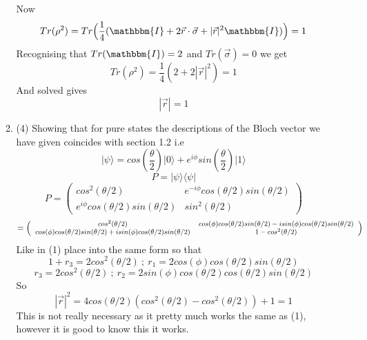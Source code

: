 \documentclass[12pt]{article}
\newcommand{\ket}[1]{\vert{#1}\rangle}
\newcommand{\bra}[1]{\langle{#1}\vert}
\begin{document}
\begin{enumerate}
\begin{enumerate}
Now 
$$ Tr(\rho^2) = Tr \Big( \frac{1}{4} ( \mathbbm{I} + 2 \vec{r} \cdot \vec{\sigma} + |\vec{r}|^2 \mathbbm{I}) \Big) = 1$$
Recognising that $Tr(\mathbbm{I}) = 2$ and $Tr(\vec{\sigma}) = 0 $ we get 
$$ Tr(\rho^2) = \frac{1}{4}(2+2|\vec{r}|^2 ) = 1 $$
And solved gives 
$$ |\vec{r}| = 1 $$ 
\item (4) Showing that for pure states the descriptions of the Bloch vector we have given coincides with section 1.2 i.e 
$$ \ket{\psi} = cos(\frac{\theta}{2}) \ket{0} + e^{i \phi} sin(\frac{\theta}{2}) \ket{1} $$ 
$$ P = \ket{\psi}\bra{\psi} $$
$$ P = \left(\begin{array}{cc} cos^2(\theta / 2) & e^{-i \phi} cos(\theta /2) sin(\theta /2)  \\ e^{i \phi} cos(\theta /2 )sin(\theta /2) & sin^2 (\theta /2)\end{array}\right)$$
$$ = \footnotesize{\left(\begin{array}{cc} cos^2(\theta / 2) & cos(\phi) cos(\theta /2)sin(\theta /2) -isin(\phi)cos(\theta /2)sin(\theta /2)  \\ cos(\phi) cos(\theta /2 )sin(\theta /2) +isin(\phi) cos(\theta /2) sin(\theta /2) & 1-cos^2 (\theta /2)\end{array}\right)}$$
Like in (1) place into the same form so that 
$$ 1 + r_3 = 2 cos^2 (\theta /2 ) \ ; \ r_1 = 2cos(\phi) cos(\theta /2 ) sin(\theta /2) $$ 
$$ r_3 = 2cos^2 (\theta /2 ) \ ; \ r_2 = 2sin(\phi) cos(\theta /2) cos(\theta /2) sin(\theta /2) $$ 
So 
$$ |\vec{r}|^2 = 4 cos(\theta /2 ) (cos^2 (\theta /2 ) - cos^2(\theta /2)) + 1 = 1 $$
This is not really necessary as it pretty much works the same as (1), however it is good to know this it works. 



\end{enumerate}
\end{enumerate}
\end{document}

